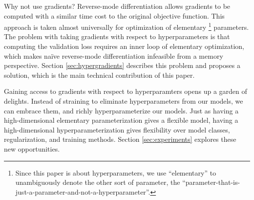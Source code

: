 \documentclass{article}
\newcommand{\primal}{elementary}
\begin{document}
Why not use gradients?
Reverse-mode differentiation allows gradients to be computed with a similar time
cost to the original objective function.
This approach is taken almost universally for optimization of \primal{}%
\footnote{Since this paper is about hyperparameters, we
  use ``\primal{}'' to unambiguously denote the other sort of parameter, the
  ``parameter-that-is-just-a-parameter-and-not-a-hyperparameter''.
}
parameters.
The problem with taking gradients with respect to hyperparameters is that computing the validation loss requires an inner loop of \primal{} optimization, which makes na\"ive reverse-mode differentiation infeasible from a memory perspective.
Section \ref{sec:hypergradients} describes this problem and proposes a solution, which is the main technical contribution of this paper.

Gaining access to gradients with respect to hyperparamters opens up a garden of
delights. Instead of straining to eliminate hyperparameters from our models, we
can embrace them, and richly hyperparameterize our models.
Just as having a high-dimensional \primal{} parameterization gives a
flexible model, having a high-dimensional hyperparameterization gives
flexibility over model classes, regularization, and training methods.
Section \ref{sec:experiments} explores these new opportunities.
\end{document}
